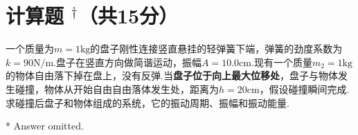 \section{计算题\! $^\dagger$（共15分）}

\begin{problem}[弹簧振子][15]
    一个质量为$m=1\mathrm{kg}$的盘子刚性连接竖直悬挂的轻弹簧下端，弹簧的劲度系数为$k=90\mathrm{N/m}$.盘子在竖直方向做简谐运动，振幅$A=10.0\mathrm{cm}$.现有一个质量$m_2=1\mathrm{kg}$的物体自由落下掉在盘上，没有反弹.当\textbf{盘子位于向上最大位移处}，盘子与物体发生碰撞，物体从开始自由自由落体发生处，距离为$h=20\mathrm{cm}$，假设碰撞瞬间完成.求碰撞后盘子和物体组成的系统，它的振动周期、振幅和振动能量.
\end{problem}
\begin{solution}*
    Answer omitted.
\end{solution}
